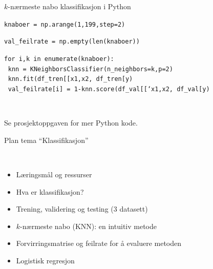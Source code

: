 \documentclass[10pt,ignorenonframetext,]{beamer}
\begin{document}
\begin{frame}[fragile]{\(k\)-nærmeste nabo klassifikasjon i Python}
\protect\hypertarget{k-nuxe6rmeste-nabo-klassifikasjon-i-python}{}

\texttt{knaboer\ =\ np.arange(1,199,step=2)}

\texttt{val\_feilrate\ =\ np.empty(len(knaboer))}

\texttt{for\ i,k\ in\ enumerate(knaboer):}\\
\(~\) \texttt{knn\ =\ KNeighborsClassifier(n\_neighbors=k,p=2)}\\
\(~\)
\texttt{knn.fit(df\_tren{[}{[}\textquotesingle{}x1\textquotesingle{},\textquotesingle{}x2\textquotesingle{}{]}{]},\ df\_tren{[}\textquotesingle{}y\textquotesingle{}{]})}\\
\(~\)
\texttt{val\_feilrate{[}i{]}\ =\ 1-knn.score(df\_val{[}{[}‘x1\textquotesingle{},\textquotesingle{}x2\textquotesingle{}{]}{]},\ df\_val{[}\textquotesingle{}y\textquotesingle{}{]})}

\(~\)

Se prosjektoppgaven for mer Python kode.

\end{frame}

\begin{frame}{Plan tema ``Klassifikasjon''}
\protect\hypertarget{plan-tema-klassifikasjon-1}{}

\(~\)

\begin{itemize}
\item
  Læringsmål og ressurser
\item
  Hva er klassifikasjon?
\item
  Trening, validering og testing (3 datasett)
\item
  \(k\)-nærmeste nabo (KNN): en intuitiv metode
\item
  Forvirringsmatrise og feilrate for å evaluere metoden
\item
  Logistisk regresjon
\end{itemize}

\end{frame}
\end{document}
